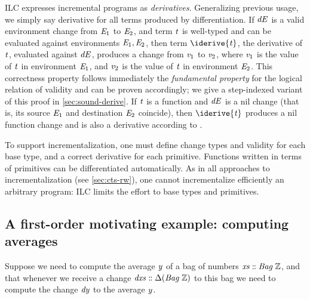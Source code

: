 ILC expresses incremental programs as \emph{derivatives}. Generalizing previous
usage, we simply say derivative for all terms produced by differentiation.
If \ensuremath{\Varid{dE}} is a valid environment change from \ensuremath{\Conid{E}_{1}} to \ensuremath{\Conid{E}_{2}}, and term \ensuremath{\Varid{t}} is
well-typed and can be evaluated against environments \ensuremath{\Conid{E}_{1},\Conid{E}_{2}},
then term \ensuremath{\iderive{\Varid{t}}}, the derivative of \ensuremath{\Varid{t}}, evaluated against \ensuremath{\Varid{dE}}, produces
a change from \ensuremath{\Varid{v}_{1}} to \ensuremath{\Varid{v}_{2}}, where \ensuremath{\Varid{v}_{1}} is the value of \ensuremath{\Varid{t}} in environment \ensuremath{\Conid{E}_{1}},
and \ensuremath{\Varid{v}_{2}} is the value of \ensuremath{\Varid{t}} in environment \ensuremath{\Conid{E}_{2}}. This correctness property follows
immediately the \emph{fundamental property} for the logical relation of
validity and can be proven accordingly; we give a step-indexed variant of this
proof in \cref{sec:sound-derive}.
If \ensuremath{\Varid{t}} is a function and \ensuremath{\Varid{dE}} is a nil change (that is, its source \ensuremath{\Conid{E}_{1}} and
destination \ensuremath{\Conid{E}_{2}} coincide), then \ensuremath{\iderive{\Varid{t}}} produces a nil function change and
is also a derivative according to \citet{CaiEtAl2014ILC}.

To support incrementalization, one must define change types and validity for
each base type, and a correct derivative for each primitive. Functions written
in terms of primitives can be differentiated automatically.
As in all approaches to incrementalization (see \cref{sec:cts-rw}), one cannot
incrementalize efficiently an arbitrary program: ILC limits the effort to base
types and primitives.

\subsection{A first-order motivating example: computing averages}
\label{sec:motivating-example}
Suppose we need to compute the average \ensuremath{\Varid{y}} of a bag of numbers \ensuremath{\Varid{xs}\mathrel{:\mkern-1mu:}\Conid{Bag}\;\mathbb{Z}},
and that whenever we receive a change \ensuremath{\Varid{dxs}\mathrel{:\mkern-1mu:}\Delta (\Conid{Bag}\;\mathbb{Z})} to this bag we
need to compute the change \ensuremath{\Varid{dy}} to the average \ensuremath{\Varid{y}}.

